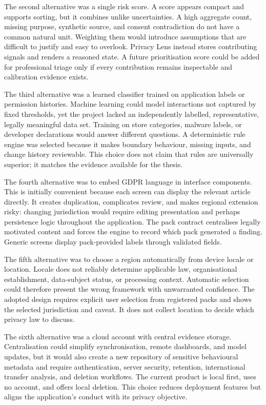 The second alternative was a single risk score. A score appears compact and supports sorting, but it combines unlike uncertainties. A high aggregate count, missing purpose, synthetic source, and consent contradiction do not have a common natural unit. Weighting them would introduce assumptions that are difficult to justify and easy to overlook. Privacy Lens instead stores contributing signals and renders a reasoned state. A future prioritisation score could be added for professional triage only if every contribution remains inspectable and calibration evidence exists.

The third alternative was a learned classifier trained on application labels or permission histories. Machine learning could model interactions not captured by fixed thresholds, yet the project lacked an independently labelled, representative, legally meaningful data set. Training on store categories, malware labels, or developer declarations would answer different questions. A deterministic rule engine was selected because it makes boundary behaviour, missing inputs, and change history reviewable. This choice does not claim that rules are universally superior; it matches the evidence available for the thesis.

The fourth alternative was to embed GDPR language in interface components. This is initially convenient because each screen can display the relevant article directly. It creates duplication, complicates review, and makes regional extension risky: changing jurisdiction would require editing presentation and perhaps persistence logic throughout the application. The pack contract centralises legally motivated content and forces the engine to record which pack generated a finding. Generic screens display pack-provided labels through validated fields.

The fifth alternative was to choose a region automatically from device locale or location. Locale does not reliably determine applicable law, organisational establishment, data-subject status, or processing context. Automatic selection could therefore present the wrong framework with unwarranted confidence. The adopted design requires explicit user selection from registered packs and shows the selected jurisdiction and caveat. It does not collect location to decide which privacy law to discuss.

The sixth alternative was a cloud account with central evidence storage. Centralisation could simplify synchronisation, remote dashboards, and model updates, but it would also create a new repository of sensitive behavioural metadata and require authentication, server security, retention, international transfer analysis, and deletion workflows. The current product is local first, uses no account, and offers local deletion. This choice reduces deployment features but aligns the application's conduct with its privacy objective.

